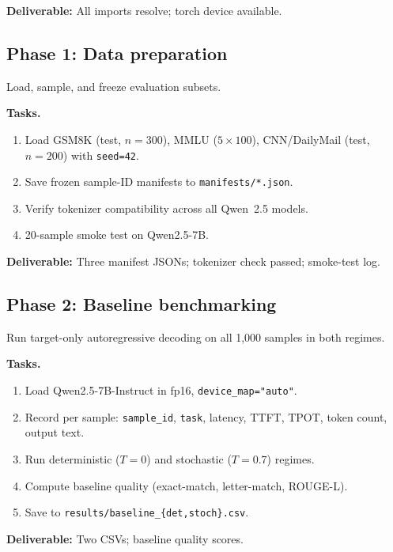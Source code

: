 \noindent\textbf{Deliverable:} All imports resolve; torch device available.

\subsection{Phase 1: Data preparation}

Load, sample, and freeze evaluation subsets.

\smallskip\noindent\textbf{Tasks.}
\begin{enumerate}\itemsep0pt
    \item Load GSM8K (test, $n{=}300$), MMLU ($5{\times}100$), CNN/DailyMail (test, $n{=}200$) with \texttt{seed=42}.
    \item Save frozen sample-ID manifests to \texttt{manifests/*.json}.
    \item Verify tokenizer compatibility across all Qwen~2.5 models.
    \item 20-sample smoke test on Qwen2.5-7B.
\end{enumerate}

\noindent\textbf{Deliverable:} Three manifest JSONs; tokenizer check passed; smoke-test log.

\subsection{Phase 2: Baseline benchmarking}

Run target-only autoregressive decoding on all 1{,}000 samples in both regimes.

\smallskip\noindent\textbf{Tasks.}
\begin{enumerate}\itemsep0pt
    \item Load Qwen2.5-7B-Instruct in fp16, \texttt{device\_map="auto"}.
    \item Record per sample: \texttt{sample\_id}, \texttt{task}, latency, TTFT, TPOT, token count, output text.
    \item Run deterministic ($T{=}0$) and stochastic ($T{=}0.7$) regimes.
    \item Compute baseline quality (exact-match, letter-match, ROUGE-L).
    \item Save to \texttt{results/baseline\_\{det,stoch\}.csv}.
\end{enumerate}

\noindent\textbf{Deliverable:} Two CSVs; baseline quality scores.

